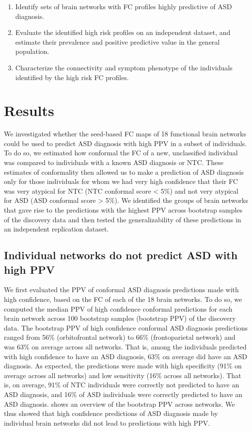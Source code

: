 \documentclass[9pt,lineno]{elife}
\begin{document}
\begin{enumerate}
    \item Identify sets of brain networks with FC profiles highly predictive of ASD diagnosis.
    \item Evaluate the identified high risk profiles on an independent dataset, and estimate their prevalence and positive predictive value in the general population.
    \item Characterize the connectivity and symptom phenotype of the individuals identified by the high risk FC profiles.
\end{enumerate}

\section{Results}
We investigated whether the seed-based FC maps of 18 functional brain networks could be used to predict ASD diagnosis with high PPV in a subset of individuals. To do so, we estimated how conformal the FC of a new, unclassified individual was compared to individuals with a known ASD diagnosis or NTC. These estimates of conformality then allowed us to make a prediction of ASD diagnosis only for those individuals for whom we had very high confidence that their FC was very atypical for NTC (NTC conformal score < 5\%) and not very atypical for ASD (ASD conformal score > 5\%). We identified the groups of brain networks that gave rise to the predictions with the highest PPV across bootstrap samples of the discovery data and then tested the generalizability of these predictions in an independent replication dataset.

\subsection{Individual networks do not predict ASD with high PPV}
We first evaluated the PPV of conformal ASD diagnosis predictions made with high confidence, based on the FC of each of the 18 brain networks. To do so, we computed the median PPV of high confidence conformal predictions for each brain network across 100 bootstrap samples (bootstrap PPV) of the discovery data. The bootstrap PPV of high confidence conformal ASD diagnosis predictions ranged from 56\% (orbitofrontal network) to 66\% (frontoparietal network) and was 63\% on average across all networks. That is, among the individuals predicted with high confidence to have an ASD diagnosis, 63\% on average did have an ASD diagnosis. As expected, the predictions were made with high specificity (91\% on average across all networks) and low sensitivity (16\% across all networks). That is, on average, 91\% of NTC individuals were correctly not predicted to have an ASD diagnosis, and 16\% of ASD individuals were correctly predicted to have an ASD diagnosis.  shows an overview of the bootstrap PPV across networks. We thus showed that high confidence predictions of ASD diagnosis made by individual brain networks did not lead to predictions with high PPV. 
\end{document}
